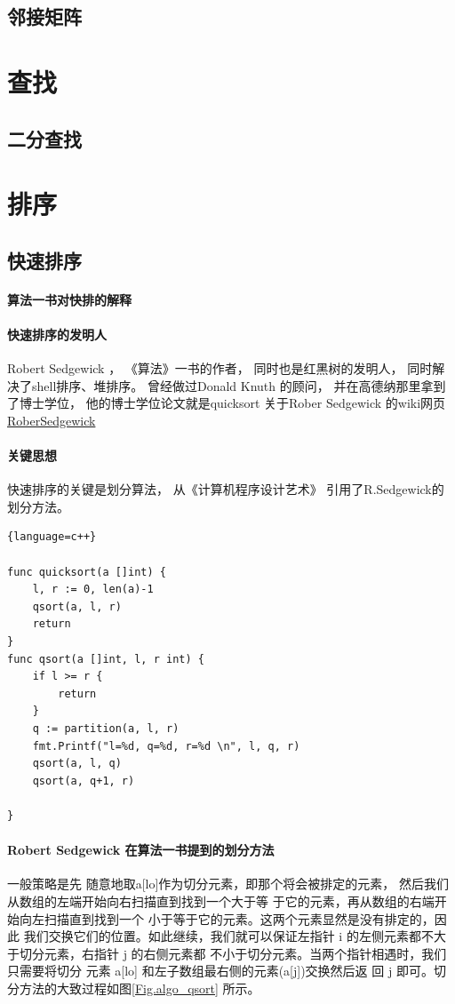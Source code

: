 \subsection{邻接矩阵}

\section{查找}
\subsection{二分查找}
\section{排序}
\subsection{快速排序}
\paragraph{算法一书对快排的解释} 
\paragraph{快速排序的发明人}Robert Sedgewick ， 《算法》一书的作者， 同时也是红黑树的发明人， 同时解决了shell排序、堆排序。 曾经做过Donald Knuth 的顾问， 并在高德纳那里拿到了博士学位， 他的博士学位论文就是quicksort 关于Rober Sedgewick 的wiki网页 
\href{https://en.wikipedia.org/wiki/Robert_Sedgewick_(computer_scientist)} {RoberSedgewick}

\paragraph{关键思想}快速排序的关键是划分算法， 从《计算机程序设计艺术》 引用了R.Sedgewick的划分方法。 

\newpage
\begin{lstlisting}{language=c++}

func quicksort(a []int) {
	l, r := 0, len(a)-1
	qsort(a, l, r)
	return
}
func qsort(a []int, l, r int) {
	if l >= r {
		return
	}
	q := partition(a, l, r)
	fmt.Printf("l=%d, q=%d, r=%d \n", l, q, r)
	qsort(a, l, q)
	qsort(a, q+1, r)
	
}
\end{lstlisting}
\newpage
\paragraph{Robert Sedgewick 在算法一书提到的划分方法}
一般策略是先 随意地取a[lo]作为切分元素，即那个将会被排定的元素， 然后我们从数组的左端开始向右扫描直到找到一个大于等 于它的元素，再从数组的右端开始向左扫描直到找到一个 小于等于它的元素。这两个元素显然是没有排定的，因此 我们交换它们的位置。如此继续，我们就可以保证左指针 i 的左侧元素都不大于切分元素，右指针 j 的右侧元素都 不小于切分元素。当两个指针相遇时，我们只需要将切分 元素 a[lo] 和左子数组最右侧的元素(a[j])交换然后返 回 j 即可。切分方法的大致过程如图\ref{Fig.algo_qsort} 所示。

